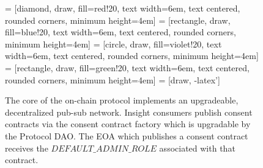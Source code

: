 \begin{figure}[!ht] 
    \centering
     = [diamond, draw, fill=red!20, 
    text width=6em, text centered, rounded corners, minimum height=4em] 
     = [rectangle, draw, fill=blue!20, 
    text width=6em, text centered, rounded corners, minimum height=4em]
     = [circle, draw, fill=violet!20, 
        text width=6em, text centered, rounded corners, minimum height=4em]
     = [rectangle, draw, fill=green!20, 
        text width=6em, text centered, rounded corners, minimum height=4em]
     = [draw, -latex']
    
    \caption{The core of the on-chain protocol implements an upgradeable, decentralized pub-sub 
    network. Insight consumers publish consent contracts via the consent contract factory which is 
    upgradable by the Protocol DAO. The EOA which publishes a consent contract receives the 
    $DEFAULT\_ADMIN\_ROLE$ associated with that contract.}
    \label{fig:ConsentFactory}
  \end{figure}